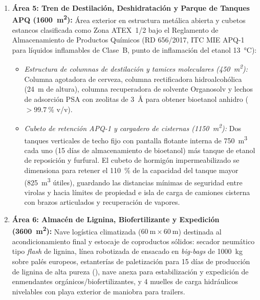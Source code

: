 \documentclass{report}
\begin{document}
\begin{enumerate}
\begin{itemize}
              \item \textit{Racks de tuberías interiores, bombeo y cuadros CCM (\SI{600}{\square\metre}):} Galerías técnicas centrales y salas eléctricas presurizadas.
          \end{itemize}
    \item \textbf{Área 5: Tren de Destilación, Deshidratación y Parque de Tanques APQ (\SI{1600}{\square\metre}):} Área exterior en estructura metálica abierta y cubetos estancos clasificada como Zona ATEX~1/2 bajo el Reglamento de Almacenamiento de Productos Químicos (RD 656/2017, ITC MIE APQ-1 para líquidos inflamables de Clase~B, punto de inflamación del etanol \SI{13}{\degreeCelsius}):
          \begin{itemize}
              \item \textit{Estructura de columnas de destilación y tamices moleculares (\SI{450}{\square\metre}):} Columna agotadora de cerveza, columna rectificadora hidroalcohólica (\SI{24}{\metre} de altura), columna recuperadora de solvente Organosolv y lechos de adsorción PSA con zeolitas de \SI{3}{\angstrom} para obtener bioetanol anhidro ($> \SI{99.7}{\percent}$ v/v).
              \item \textit{Cubeto de retención APQ-1 y cargadero de cisternas (\SI{1150}{\square\metre}):} Dos tanques verticales de techo fijo con pantalla flotante interna de \SI{750}{\cubic\metre} cada uno (\num{15} días de almacenamiento de bioetanol) más tanque de etanol de reposición y furfural. El cubeto de hormigón impermeabilizado se dimensiona para retener el \SI{110}{\percent} de la capacidad del tanque mayor (\SI{825}{\cubic\metre} útiles), guardando las distancias mínimas de seguridad entre virolas y hacia límites de propiedad e isla de carga de camiones cisterna con brazos articulados y recuperación de vapores.
          \end{itemize}
    \item \textbf{Área 6: Almacén de Lignina, Biofertilizante y Expedición (\SI{3600}{\square\metre}):} Nave logística climatizada ($\SI{60}{\metre} \times \SI{60}{\metre}$) destinada al acondicionamiento final y estocaje de coproductos sólidos: secador neumático tipo \textit{flash} de lignina, línea robotizada de ensacado en \textit{big-bags} de \SI{1000}{\kilo\gram} sobre palés europeos, estanterías de paletización para \num{15} días de producción de lignina de alta pureza (\textcite{RomeroGarcia2022}), nave anexa para estabilización y expedición de enmendantes orgánicos/biofertilizantes, y \num{4} muelles de carga hidráulicos nivelables con playa exterior de maniobra para trailers.

\end{enumerate}
\end{document}
